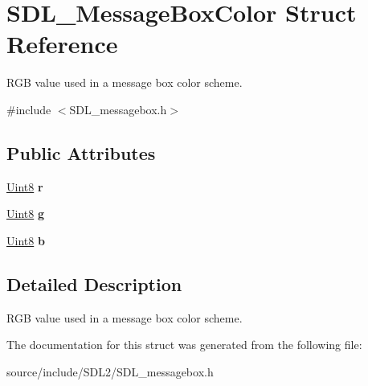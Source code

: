\hypertarget{struct_s_d_l___message_box_color}{}\section{S\+D\+L\+\_\+\+Message\+Box\+Color Struct Reference}
\label{struct_s_d_l___message_box_color}


R\+G\+B value used in a message box color scheme.  




{\ttfamily \#include $<$S\+D\+L\+\_\+messagebox.\+h$>$}

\subsection*{Public Attributes}
\begin{DoxyCompactItemize}
\item 
\hypertarget{struct_s_d_l___message_box_color_a43ab2172c10058380fcf67ecc3f53184}{}\hyperlink{_s_d_l__stdinc_8h_a2944638813a090aa23e62f4da842c3e2}{Uint8} {\bfseries r}\label{struct_s_d_l___message_box_color_a43ab2172c10058380fcf67ecc3f53184}

\item 
\hypertarget{struct_s_d_l___message_box_color_a5820adab0b32aa3eade101ea36ed6b4a}{}\hyperlink{_s_d_l__stdinc_8h_a2944638813a090aa23e62f4da842c3e2}{Uint8} {\bfseries g}\label{struct_s_d_l___message_box_color_a5820adab0b32aa3eade101ea36ed6b4a}

\item 
\hypertarget{struct_s_d_l___message_box_color_ad1215a42167cb5b190ff8f19dbd42066}{}\hyperlink{_s_d_l__stdinc_8h_a2944638813a090aa23e62f4da842c3e2}{Uint8} {\bfseries b}\label{struct_s_d_l___message_box_color_ad1215a42167cb5b190ff8f19dbd42066}

\end{DoxyCompactItemize}


\subsection{Detailed Description}
R\+G\+B value used in a message box color scheme. 

The documentation for this struct was generated from the following file\+:\begin{DoxyCompactItemize}
\item 
source/include/\+S\+D\+L2/S\+D\+L\+\_\+messagebox.\+h\end{DoxyCompactItemize}
